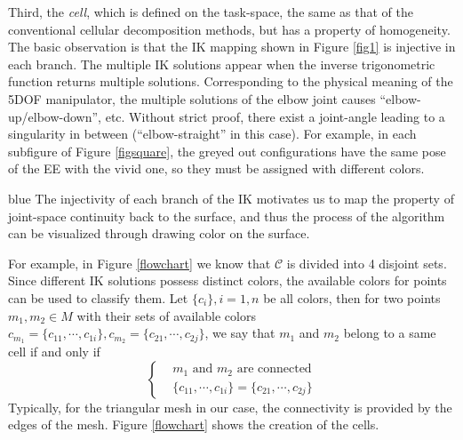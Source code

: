 \documentclass[journal]{IEEEtran}
\begin{document}
Third, the \textit{cell}, which is defined on the task-space, the same as that of the conventional cellular decomposition methods, but has a property of homogeneity. 
The basic observation is that the IK mapping shown in Figure \ref{fig1} is injective in each branch. 
The multiple IK solutions appear when the inverse trigonometric function returns multiple solutions. Corresponding to the physical meaning of the 5DOF manipulator, the multiple solutions of the elbow joint causes ``elbow-up/elbow-down'', etc.  
Without strict proof, there exist a joint-angle leading to a singularity in between (``elbow-straight'' in this case). 
For example, in each subfigure of Figure \ref{figsquare}, the greyed out configurations have the same pose of the EE with the vivid one, so they must be assigned with different colors. 
\begin{color}{blue}
The injectivity of each branch of the IK motivates us to map the property of joint-space continuity back to the surface, and thus the process of the algorithm can be visualized through drawing color on the surface. %
\end{color}
For example, in Figure \ref{flowchart} we know that $\mathscr{C}$ is divided into 4 disjoint sets. 
Since different IK solutions possess distinct colors, the available colors for points can be used to classify them. Let $\{c_i\}, i = 1, n$ be all colors, then for two points $m_1, m_2\in M$ with their sets of available colors $c_{m_1} = \{c_{11}, \cdots, c_{1i}\}, c_{m_2} = \{c_{21}, \cdots, c_{2j}\}$, we say that $m_1$ and $m_2$ belong to a same cell if and only if 
$$\left\{
\begin{aligned}
& m_1 \mbox{ and } m_2 \mbox{ are connected}\\
& \{c_{11}, \cdots, c_{1i}\} = \{c_{21}, \cdots, c_{2j}\}
\end{aligned}
\right.$$
Typically, for the triangular mesh in our case, the connectivity is provided by the edges of the mesh. Figure \ref{flowchart} shows the creation of the cells. 
\end{document}
